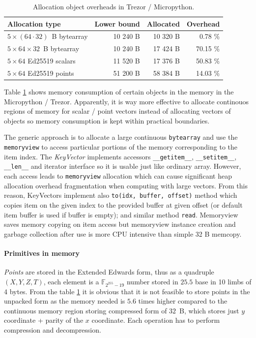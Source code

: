 \documentclass[]{article}
\begin{document}
\begin{table}[H]
	\caption{Allocation object overheads in Trezor / Micropython.}\label{tbl:alloc}
	\begin{center}
		\begin{tabular}{p{4.5cm} rrr}
			\hline
			Allocation type                      & Lower bound  & Allocated  &  Overhead   \\ \hline
			$5 \times (64 \cdot 32)$~B bytearray & 	10 240 B    & 10 320 B   &  0.78 \%    \\          
			$5 \times 64 \times 32$~B bytearray  &  10 240 B    & 17 424 B   &  70.15 \%      \\ 
			$5 \times 64$ Ed25519 scalars        &  11 520 B    & 17 376 B   &  50.83 \%      \\ 
			$5 \times 64$ Ed25519 points    &  51 200 B    & 58 384 B   &  14.03 \%      \\ 
			
		\end{tabular}
	\end{center}
\end{table}

Table \ref{tbl:alloc} shows memory consumption of certain objects in the memory in the Micropython / Trezor. Apparently, it is way more effective to allocate continouos regions of memory for scalar / point vectors instead of allocating vectors of objects so memory consumption is kept within practical boundaries. 

The generic approach is to allocate a large continuous \verb|bytearray| and use the \verb|memoryview| to access particular portions of the memory corresponding to the item index. The \emph{KeyVector} implements accessors \verb|__getitem__|, \verb|__setitem__|, \verb|__len__| and iterator interface so it is usable just like ordinary array.
However, each access leads to \verb|memoryview| allocation which can cause significant heap allocation overhead fragmentation when computing with large vectors. From this reason, KeyVectors implement also \verb|to(idx, buffer, offset)| method which copies item on the given index to the provided buffer at given offset (or default item buffer is used if buffer is empty); and similar method \verb|read|. Memoryview saves memory copying on item access but memoryview instance creation and garbage collection after use is more CPU intensive than simple 32 B memcopy.

\paragraph{Primitives in memory}
\emph{Points} are stored in the Extended Edwards form, thus as a quadruple $(X, Y, Z, T)$, each element is a $\mathbb{F}_{2^{255}-19}$ number stored in $25.5$ base in 10 limbs of 4 bytes. From the table \ref{tbl:alloc} it is obvious that it is not feasible to store points in the unpacked form as the memory needed is $5.6$ times higher compared to the continuous memory region storing compressed form of $32$~B, which stores just $y$ coordinate + parity of the $x$ coordinate. Each operation has to perform compression and decompression.
\end{document}
